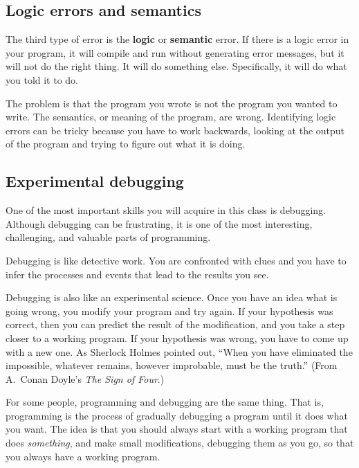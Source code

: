 \documentclass[12pt]{book}
\theoremstyle{exercise}
\begin{document}
\subsection{Logic errors and semantics}

The third type of error is the {\bf logic} or {\bf semantic} error.
If there is a logic error in your program, it will compile and run
without generating error messages, but it will not do the right thing.
It will do something else.  Specifically, it will do what you told it
to do.

The problem is that the program you wrote is not the program you
wanted to write.  The semantics, or meaning of the program, are wrong.
Identifying logic errors can be tricky because you have to work
backwards, looking at the output of the program and trying to figure
out what it is doing.

\subsection{Experimental debugging}

One of the most important skills you will acquire in this
class is debugging.  Although debugging can be frustrating, it
is one of the most interesting, challenging, and
valuable parts of programming.

Debugging is like detective work.  You are
confronted with clues and you have to infer the processes
and events that lead to the results you see.

Debugging is also like an experimental science.  Once you have an idea
what is going wrong, you modify your program and try again.  If your
hypothesis was correct, then you can predict the result of the
modification, and you take a step closer to a working program.  If
your hypothesis was wrong, you have to come up with a new one.  As
Sherlock Holmes pointed out, ``When you have eliminated the
impossible, whatever remains, however improbable, must be the truth.''
(From A.~Conan Doyle's {\em The Sign of Four}.)


For some people, programming and debugging are the
same thing.  That is, programming is the process of gradually
debugging a program until it does what you want.  The idea
is that you should always start with a working program that
does {\em something}, and make small modifications, debugging
them as you go, so that you always have a working program.
\end{document}
